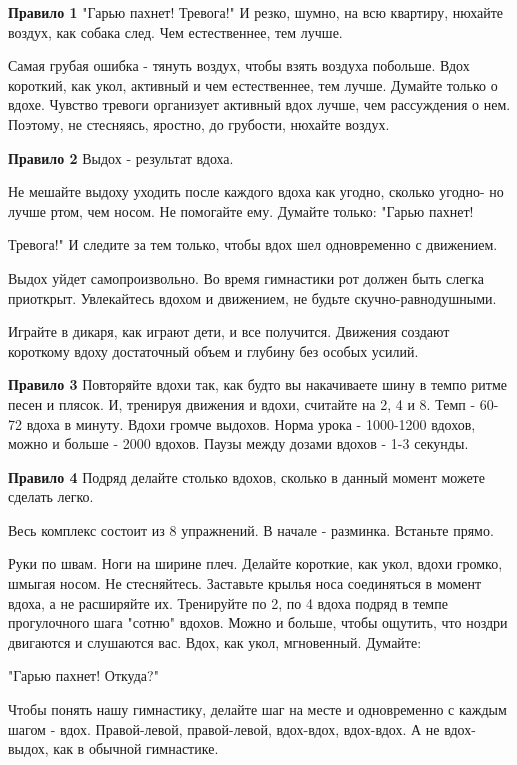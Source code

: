 \documentclass[14pt, a4paper]{article}
\begin{document}
    \textbf{Правило 1}
    "Гарью пахнет! Тревога!" И резко, шумно, на всю квартиру, нюхайте воздух, как собака след. Чем естественнее, тем лучше.

    Самая грубая ошибка - тянуть воздух, чтобы взять воздуха побольше. Вдох короткий, как укол, активный и чем естественнее, тем лучше. Думайте только о вдохе. Чувство тревоги организует активный вдох лучше, чем рассуждения о нем. Поэтому, не стесняясь, яростно, до грубости, нюхайте воздух.

    \textbf{Правило 2}
    Выдох - результат вдоха.

    Не мешайте выдоху уходить после каждого вдоха как угодно, сколько угодно- но лучше ртом, чем носом. Не помогайте ему. Думайте только: "Гарью пахнет!

    Тревога!" И следите за тем только, чтобы вдох шел одновременно с движением.

    Выдох уйдет самопроизвольно. Во время гимнастики рот должен быть слегка приоткрыт. Увлекайтесь вдохом и движением, не будьте скучно-равнодушными.

    Играйте в дикаря, как играют дети, и все получится. Движения создают короткому вдоху достаточный объем и глубину без особых усилий.

    \textbf{Правило 3}
    Повторяйте вдохи так, как будто вы накачиваете шину в темпо ритме песен и плясок. И, тренируя движения и вдохи, считайте на 2, 4 и 8. Темп - 60-72 вдоха в минуту. Вдохи громче выдохов. Норма урока - 1000-1200 вдохов, можно и больше - 2000 вдохов. Паузы между дозами вдохов - 1-3 секунды.

    \textbf{Правило 4}
    Подряд делайте столько вдохов, сколько в данный момент можете сделать легко.

    Весь комплекс состоит из 8 упражнений. В начале - разминка. Встаньте прямо.

    Руки по швам. Ноги на ширине плеч. Делайте короткие, как укол, вдохи громко, шмыгая носом. Не стесняйтесь. Заставьте крылья носа соединяться в момент вдоха, а не расширяйте их. Тренируйте по 2, по 4 вдоха подряд в темпе прогулочного шага "сотню" вдохов. Можно и больше, чтобы ощутить, что ноздри двигаются и слушаются вас. Вдох, как укол, мгновенный. Думайте:

    "Гарью пахнет! Откуда?"

    Чтобы понять нашу гимнастику, делайте шаг на месте и одновременно с каждым шагом - вдох. Правой-левой, правой-левой, вдох-вдох, вдох-вдох. А не вдох-выдох, как в обычной гимнастике.
\end{document}
